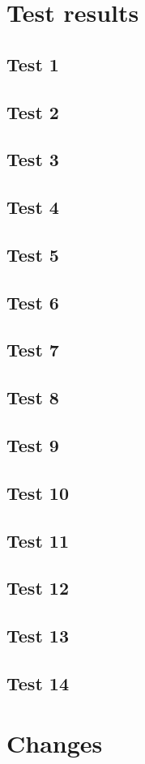 \section{Test results}

\subsection{Test 1}


\subsection{Test 2}


\subsection{Test 3}


\subsection{Test 4}


\subsection{Test 5}


\subsection{Test 6}


\subsection{Test 7}


\subsection{Test 8}


\subsection{Test 9}


\subsection{Test 10}


\subsection{Test 11}


\subsection{Test 12}


\subsection{Test 13}


\subsection{Test 14}


\section{Changes}
